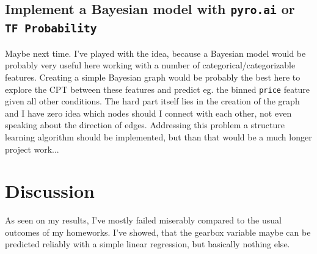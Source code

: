 \subsection{Implement a Bayesian model with \texttt{pyro.ai} or \texttt{TF Probability}}
Maybe next time. I've played with the idea, because a Bayesian model would be probably very useful here working with a number of categorical/categorizable features. Creating a simple Bayesian graph would be probably the best here to explore the CPT between these features and predict eg. the binned \texttt{price} feature given all other conditions. The hard part itself lies in the creation of the graph and I have zero idea which nodes should I connect with each other, not even speaking about the direction of edges. Addressing this problem a structure learning algorithm should be implemented, but than that would be a much longer project work...
\newpage
\section{Discussion}
As seen on my results, I've mostly failed miserably compared to the usual outcomes of my homeworks. I've showed, that the gearbox variable maybe can be predicted reliably with a simple linear regression, but basically nothing else.
\newpage
